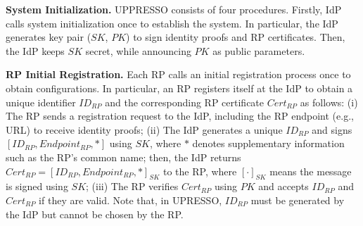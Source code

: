 \noindent \textbf{System Initialization.} UPPRESSO consists of four procedures. Firstly, IdP calls system initialization once to establish the system.
In particular, the IdP generates key pair ($SK$, $PK$) to sign identity proofs and RP certificates.
Then, the IdP keeps $SK$ secret, while announcing %
$PK$ as public parameters.

\noindent\textbf{RP Initial Registration.} Each RP calls an initial registration process once to obtain configurations. In particular, an RP registers itself at the IdP to obtain a unique identifier $ID_{RP}$ and the corresponding RP certificate $Cert_{RP}$ as follows: (i) The RP sends
a registration request to the IdP, including
the RP endpoint (e.g., URL) to receive identity proofs; (ii) The IdP generates a unique $ID_{RP}$ and signs $[ID_{RP}, Endpoint_{RP}, *]$ using $SK$, where $*$ denotes supplementary information such as the RP's common name; then, the IdP returns $Cert_{RP} = [ID_{RP}, Endpoint_{RP}, *]_{SK}$ to the RP, where $[\cdot]_{SK}$ means the message is signed using $SK$; (iii) The RP verifies $Cert_{RP}$ using $PK$ and accepts $ID_{RP}$ and $Cert_{RP}$ if they are valid.
Note that, in UPRESSO, $ID_{RP}$ must be generated by the IdP but cannot be chosen by the RP.%

